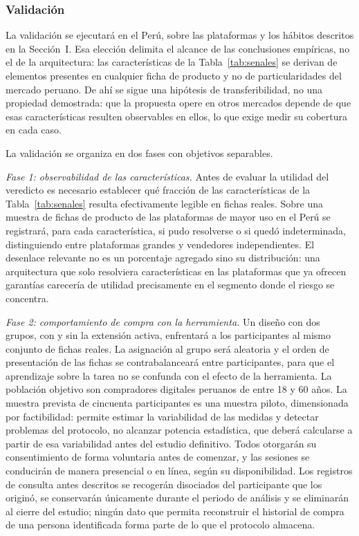 \subsubsection{Validación}

La validación se ejecutará en el Perú, sobre las plataformas y los hábitos descritos en la
Sección~I. Esa elección delimita el alcance de las conclusiones empíricas, no el de la
arquitectura: las características de la Tabla~\ref{tab:senales} se derivan de elementos
presentes en cualquier ficha de producto y no de particularidades del mercado peruano. De ahí
se sigue una hipótesis de transferibilidad, no una propiedad demostrada: que la propuesta
opere en otros mercados depende de que esas características resulten observables en ellos, lo
que exige medir su cobertura en cada caso.

La validación se organiza en dos fases con objetivos separables.

\emph{Fase 1: observabilidad de las características.} Antes de evaluar la utilidad del
veredicto es necesario establecer qué fracción de las características de la
Tabla~\ref{tab:senales} resulta efectivamente legible en fichas reales. Sobre una muestra de
fichas de producto de las plataformas de mayor uso en el Perú se registrará, para cada
característica, si pudo resolverse o si quedó indeterminada, distinguiendo entre plataformas
grandes y vendedores independientes. El desenlace relevante no es un porcentaje agregado sino
su distribución: una arquitectura que solo resolviera características en las plataformas que ya
ofrecen garantías carecería de utilidad precisamente en el segmento donde el riesgo se
concentra.

\emph{Fase 2: comportamiento de compra con la herramienta.} Un diseño con dos grupos, con y
sin la extensión activa, enfrentará a los participantes al mismo conjunto de fichas reales. La
asignación al grupo será aleatoria y el orden de presentación de las fichas se
contrabalanceará entre participantes, para que el aprendizaje sobre la tarea no se confunda
con el efecto de la herramienta. La población objetivo son compradores digitales peruanos de
entre 18 y 60 años. La muestra prevista de cincuenta participantes es una muestra piloto,
dimensionada por factibilidad: permite estimar la variabilidad de las medidas y detectar
problemas del protocolo, no alcanzar potencia estadística, que deberá calcularse a partir de
esa variabilidad antes del estudio definitivo. Todos otorgarán su consentimiento de forma
voluntaria antes de comenzar, y las sesiones se conducirán de manera presencial o en línea,
según su disponibilidad. Los registros de consulta antes descritos se recogerán
disociados del participante que los originó, se conservarán únicamente durante el periodo de
análisis y se eliminarán al cierre del estudio; ningún dato que permita reconstruir el
historial de compra de una persona identificada forma parte de lo que el protocolo almacena.

